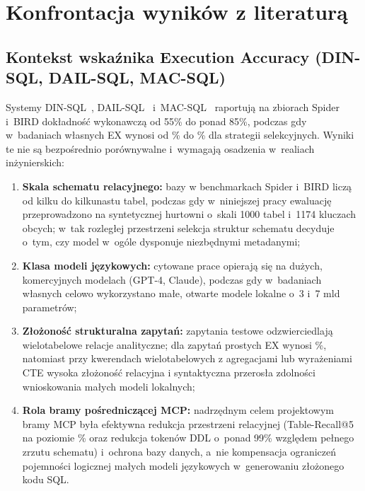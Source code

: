 \section{Konfrontacja wyników z literaturą}
\label{sec:wyniki_dyskusja_polemiczna}

\subsection{Kontekst wskaźnika Execution Accuracy (DIN-SQL, DAIL-SQL, MAC-SQL)}
\label{subsec:wyniki_polemika_text2sql}

Systemy DIN-SQL~\cite{pourreza2023dinsql}, DAIL-SQL~\cite{gao2024dailsql} i~MAC-SQL~\cite{wang2025macsql} raportują na zbiorach Spider i~BIRD dokładność wykonawczą od 55\% do ponad 85\%, podczas gdy w~badaniach własnych EX wynosi od \wynExSmallBmFive\% do \wynExLargeBmEight\% dla strategii selekcyjnych. Wyniki te nie są bezpośrednio porównywalne i~wymagają osadzenia w~realiach inżynierskich:
\begin{enumerate}
    \item \textbf{Skala schematu relacyjnego:} bazy w benchmarkach Spider i~BIRD liczą od kilku do kilkunastu tabel, podczas gdy w~niniejszej pracy ewaluację przeprowadzono na syntetycznej hurtowni o~skali 1000 tabel i~1174 kluczach obcych; w~tak rozległej przestrzeni selekcja struktur schematu decyduje o~tym, czy model w~ogóle dysponuje niezbędnymi metadanymi;
    \item \textbf{Klasa modeli językowych:} cytowane prace opierają się na dużych, komercyjnych modelach (GPT-4, Claude), podczas gdy w~badaniach własnych celowo wykorzystano małe, otwarte modele lokalne o~3 i~7 mld parametrów;
    \item \textbf{Złożoność strukturalna zapytań:} zapytania testowe odzwierciedlają wielotabelowe relacje analityczne; dla zapytań prostych EX wynosi \wynOnineExSimple\%, natomiast przy kwerendach wielotabelowych z agregacjami lub wyrażeniami CTE wysoka złożoność relacyjna i syntaktyczna przerosła zdolności wnioskowania małych modeli lokalnych;
    \item \textbf{Rola bramy pośredniczącej MCP:} nadrzędnym celem projektowym bramy MCP była efektywna redukcja przestrzeni relacyjnej (Table-Recall@5 na poziomie \wynRecallGraphFive\% oraz redukcja tokenów DDL o~ponad 99\% względem pełnego zrzutu schematu) i~ochrona bazy danych, a~nie kompensacja ograniczeń pojemności logicznej małych modeli językowych w~generowaniu złożonego kodu SQL.
\end{enumerate}

